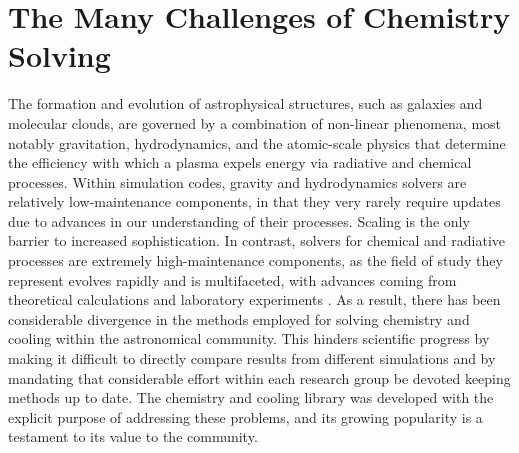 \section{The Many Challenges of Chemistry Solving}

The formation and evolution of astrophysical structures, such as
galaxies and molecular clouds, are governed
by a combination of non-linear phenomena, most notably gravitation,
hydrodynamics, and the atomic-scale physics that determine the
efficiency with which a plasma expels energy via radiative and
chemical processes.  Within simulation codes, gravity and
hydrodynamics solvers are relatively low-maintenance components, in
that they very rarely require updates due to advances in our
understanding of their processes.  Scaling is the only barrier to
increased sophistication.
In contrast, solvers for chemical and radiative processes are
extremely high-maintenance components, as the field of study they
represent evolves rapidly and is multifaceted, with advances coming
from theoretical calculations \citep[e.g.,][]{2007MNRAS.377..705F,
  2007MNRAS.382..133W, 2008MNRAS.388.1627G, 2008ApJ...689.1105L,
  2012JChPh.137o4303L, 2014ApJ...790...10S, 2015MNRAS.453..810L,
  2016MNRAS.457.3732C, 2017MNRAS.466.2175C} and laboratory experiments
\citep[e.g.,][]{2010Sci...329...69K, 2010PhRvA..82d2708B,
  2011PhRvA..84e2709M, 2015JPhCS.635b2092R, 2015ApJS..219....6O,
  2016ApJ...816...31D, 2016ApJ...832...31V}.  As a result, there
has been considerable divergence in the methods employed for solving chemistry
and cooling within the astronomical community.  This hinders scientific
progress by making it difficult to directly compare results from
different simulations and by mandating that considerable effort
within each research group be devoted keeping methods up to date.  The
\grackle{} chemistry and cooling library was developed with the
explicit purpose of addressing these problems, and its growing popularity
is a testament to its value to the community.

